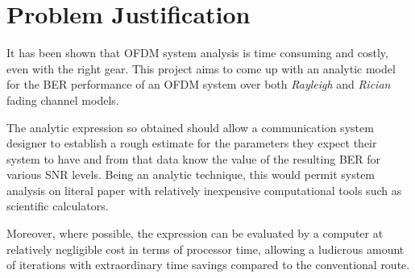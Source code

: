 \section{Problem Justification}
It has been shown that \gls{OFDM} system analysis is time consuming and costly, even with the right gear. This project aims to come up with an analytic model for the \gls{BER} performance of an \gls{OFDM} system over both \emph{Rayleigh} and \emph{Rician} fading channel models.

The analytic expression so obtained should allow a communication system designer to establish a rough estimate for the parameters they expect their system to have and from that data know the value of the resulting BER for various \gls{SNR} levels. Being an analytic technique, this would permit system analysis on literal paper with relatively inexpensive computational tools such as scientific calculators.

Moreover, where possible, the expression can be evaluated by a computer at relatively negligible cost in terms of processor time, allowing a ludicrous amount of iterations with extraordinary time savings compared to the conventional route.

